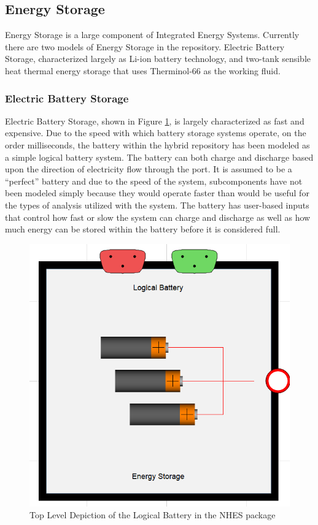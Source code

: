 \subsection{Energy Storage}
Energy Storage is a large component of Integrated Energy Systems. Currently there are two models of Energy Storage in the repository. Electric Battery Storage, characterized largely as Li-ion battery technology, and two-tank sensible heat thermal energy storage that uses Therminol-66 as the working fluid. 


\subsubsection{Electric Battery Storage}

Electric Battery Storage, shown in Figure \ref{Top View Logical Battery}, is largely characterized as fast and expensive. Due to the speed with which battery storage systems operate, on the order milliseconds, the battery within the hybrid repository has been modeled as a simple logical battery system. The battery can both charge and discharge based upon the direction of electricity flow through the port. It is assumed to be a “perfect” battery and due to the speed of the system, subcomponents have not been modeled simply because they would operate faster than would be useful for the types of analysis utilized with the system. The battery has user-based inputs that control how fast or slow the system can charge and discharge as well as how much energy can be stored within the battery before it is considered full.   

\begin{figure}[hbtp]
\centering
\includegraphics[scale=0.4]{pics/Battery_Storage.png}
\caption{Top Level Depiction of the Logical Battery in the NHES package}
\label{Top View Logical Battery}
\end{figure}


